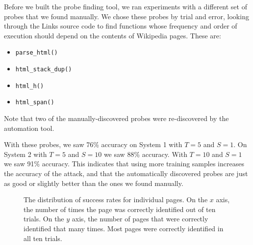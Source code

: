 \documentclass[letterpaper,twocolumn,10pt]{article}
\begin{document}
Before we built the probe finding tool, we ran experiments with a different set
of probes that we found manually. We chose these probes by trial and error,
looking through the Links source code to find functions whose frequency and
order of execution should depend on the contents of Wikipedia pages. These are:

\begin{itemize}
    \item \texttt{parse\_html()}
    \item \texttt{html\_stack\_dup()}
    \item \texttt{html\_h()}
    \item \texttt{html\_span()}
\end{itemize}

Note that two of the manually-discovered probes were re-discovered by the
automation tool.

With these probes, we saw 76\% accuracy on System 1 with $T=5$ and
$S=1$. On System 2 with $T=5$
and $S=10$ we saw 88\% accuracy. With $T=10$ and
$S=1$ we saw 91\% accuracy. This indicates that using
more training samples increases the accuracy of the attack, and that the
automatically discovered probes are just as good or slightly better than the
ones we found manually.

\begin{figure}
    \centering
    \caption{The distribution of success rates for individual pages. On the $x$
        axis, the number of times the page was correctly identified out of ten
        trials. On the $y$ axis, the number of pages that were correctly
        identified that many times. Most pages were correctly identified in all
        ten trials.}
    \label{figure:distribution}
\end{figure}
\end{document}
